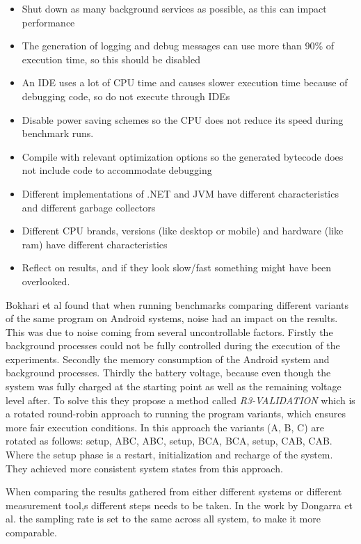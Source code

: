 \begin{itemize}
    \item Shut down as many background services as possible, as this can impact performance
    \item The generation of logging and debug messages can use more than 90\% of execution time, so this should be disabled
    \item An IDE uses a lot of CPU time and causes slower execution time because of debugging code, so do not execute through IDEs
    \item Disable power saving schemes so the CPU does not reduce its speed during benchmark runs.
    \item Compile with relevant optimization options so the generated bytecode does not include code to accommodate debugging
    \item Different implementations of .NET and JVM have different characteristics and different garbage collectors
    \item Different CPU brands, versions (like desktop or mobile) and hardware (like ram) have different characteristics
    \item Reflect on results, and if they look slow/fast something might have been overlooked.
\end{itemize}



Bokhari et al\cite{Bokhari2020r3} found that when running benchmarks comparing different variants of the same program on Android systems, noise had an impact on the results. This was due to noise coming from several uncontrollable factors. Firstly the background processes could not be fully controlled during the execution of the experiments. Secondly the memory consumption of the Android system and background processes. Thirdly the battery voltage, because even though the system was fully charged at the starting point as well as the remaining voltage level after. To solve this they propose a method called \textit{R3-VALIDATION} which is a rotated round-robin approach to running the program variants, which ensures more fair execution conditions. In this approach the variants (A, B, C) are rotated as follows: setup, ABC, ABC, setup, BCA, BCA, setup, CAB, CAB. Where the setup phase is a restart, initialization and recharge of the system. They achieved more consistent system states from this approach.

When comparing the results gathered from either different systems or different measurement tool,s different steps needs to be taken. In the work by Dongarra et al.\cite*[]{Dongarra2012} the sampling rate is set to the same across all system, to make it more comparable.